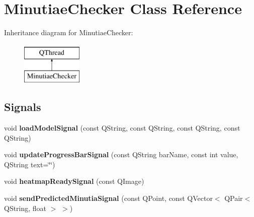 \hypertarget{class_minutiae_checker}{}\section{Minutiae\+Checker Class Reference}
\label{class_minutiae_checker}
Inheritance diagram for Minutiae\+Checker\+:\begin{figure}[H]
\begin{center}
\leavevmode
\includegraphics[height=2.000000cm]{class_minutiae_checker}
\end{center}
\end{figure}
\subsection*{Signals}
\begin{DoxyCompactItemize}
\item 
\mbox{\label{class_minutiae_checker_a67c72792280b28caf7aca1fb906a486e}} 
void {\bfseries load\+Model\+Signal} (const Q\+String, const Q\+String, const Q\+String, const Q\+String)
\item 
\mbox{\label{class_minutiae_checker_ae22d8105ea83aa639ae0b28c510cd62e}} 
void {\bfseries update\+Progress\+Bar\+Signal} (const Q\+String bar\+Name, const int value, Q\+String text=\char`\"{}\char`\"{})
\item 
\mbox{\label{class_minutiae_checker_abab80e6150b52628c515226910c8e9b3}} 
void {\bfseries heatmap\+Ready\+Signal} (const Q\+Image)
\item 
\mbox{\label{class_minutiae_checker_add5c21546c201d470e6846f6dc3e2f56}} 
void {\bfseries send\+Predicted\+Minutia\+Signal} (const Q\+Point, const Q\+Vector$<$ Q\+Pair$<$ Q\+String, float $>$ $>$)
\end{DoxyCompactItemize}
